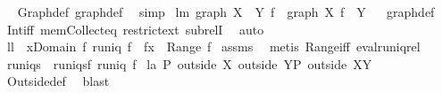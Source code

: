 \begin{isabellebody}
\ %
\endisadelimproof
%
\isatagproof
{}\isamarkupfalse%
\ Graph{\isacharunderscore}def\ graph{\isacharunderscore}def\ \isamarkupfalse%
\ simp%
\endisatagproof
{\isafoldproof}%
%
\isadelimproof
%
\endisadelimproof
\isanewline
\isanewline
{}\isamarkupfalse%
\ lm{}{}{\isacharcolon}\ {\isachardoublequoteopen}graph\ {\isacharparenleft}X\ {\isasyminter}\ Y{\isacharparenright}\ f\ {\isasymsubseteq}\ graph\ X\ f\ {\isacharbar}{\isacharbar}\ Y{\isachardoublequoteclose}%
\isadelimproof
\ %
\endisadelimproof
%
\isatagproof
{}\isamarkupfalse%
\ graph{\isacharunderscore}def\ \isanewline
{}\isamarkupfalse%
\ Int{\isacharunderscore}iff\ mem{\isacharunderscore}Collect{\isacharunderscore}eq\ restrict{\isacharunderscore}ext\ subrelI\ \isamarkupfalse%
\ auto%
\endisatagproof
{\isafoldproof}%
%
\isadelimproof
%
\endisadelimproof
\isanewline
\isanewline
\isanewline
\isanewline
\isanewline
\isanewline
\isanewline
\isanewline
\isanewline
\isanewline
\isanewline
\isanewline
\isanewline
\isanewline
\isanewline
\isanewline
\isanewline
\isanewline
\isanewline
{}\isamarkupfalse%
\ ll{}{}{\isacharcolon}\ \ {\isachardoublequoteopen}x{\isasymin}Domain\ f{\isachardoublequoteclose}\ {\isachardoublequoteopen}runiq\ f{\isachardoublequoteclose}\ \ {\isachardoublequoteopen}f{\isacharcomma}{\isacharcomma}x\ {\isasymin}\ Range\ f{\isachardoublequoteclose}\isanewline
%
\isadelimproof
%
\endisadelimproof
%
\isatagproof
{}\isamarkupfalse%
\ assms\ \isamarkupfalse%
\ {\isacharparenleft}metis\ Range{\isacharunderscore}iff\ eval{\isacharunderscore}runiq{\isacharunderscore}rel{\isacharparenright}%
\endisatagproof
{\isafoldproof}%
%
\isadelimproof
\isanewline
%
\endisadelimproof
\isanewline
{}\isamarkupfalse%
\ runiqs\ \ {\isachardoublequoteopen}runiqs{\isacharequal}{\isacharbraceleft}f{\isachardot}\ runiq\ f{\isacharbraceright}{\isachardoublequoteclose}\isanewline
\isanewline
{}\isamarkupfalse%
\ l{}{}a{\isacharcolon}\ {\isachardoublequoteopen}{\isacharparenleft}P\ outside\ X{\isacharparenright}\ outside\ Y{\isacharequal}P\ outside\ {\isacharparenleft}X{\isasymunion}Y{\isacharparenright}{\isachardoublequoteclose}%
\isadelimproof
\ %
\endisadelimproof
%
\isatagproof
{}\isamarkupfalse%
\ Outside{\isacharunderscore}def\ \isamarkupfalse%
\ blast%
\endisatagproof

\end{isabellebody}
